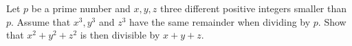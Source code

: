 Let $p$ be a prime number and $x,y,z$ three different positive integers smaller than $p$.
Assume that $x^3,y^3$ and $z^3$ have the same remainder when dividing by $p$.
Show that $x^2+y^2+z^2$ is then divisible by $x+y+z$.